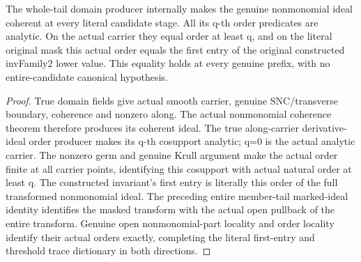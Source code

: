 \begin{lemma}
\label{hir:member-lower-order-actual-analytic-trace}
\leanok
The whole-tail domain producer internally makes the genuine nonmonomial ideal
coherent at every literal candidate stage. All its q-th order predicates are
analytic. On the actual carrier they equal order at least q, and on the
literal original mask this actual order equals the first entry of the original
constructed invFamily2 lower value. This equality holds at every genuine
prefix, with no entire-candidate canonical hypothesis.
\end{lemma}
\begin{proof}
True domain fields give actual smooth carrier, genuine SNC/transverse boundary,
coherence and nonzero along. The actual nonmonomial coherence theorem therefore
produces its coherent ideal. The true along-carrier derivative-ideal order
producer makes its q-th cosupport analytic; q=0 is the actual analytic carrier.
The nonzero germ and genuine Krull argument make the actual order finite at
all carrier points, identifying this cosupport with actual natural order at
least q. The constructed invariant's first entry is literally this order of
the full transformed nonmonomial ideal. The preceding entire member-tail
marked-ideal identity identifies the masked transform with the actual open
pullback of the entire transform. Genuine open nonmonomial-part locality and
order locality identify their actual orders exactly, completing the literal
first-entry and threshold trace dictionary in both directions.
\end{proof}

